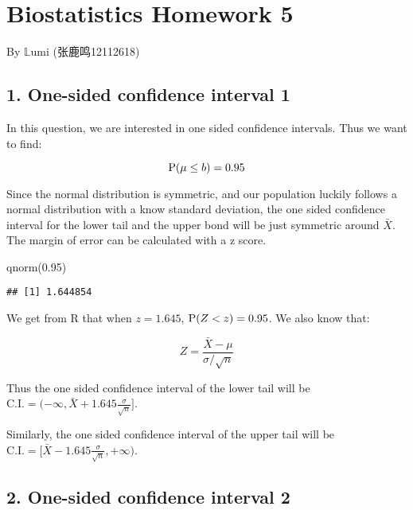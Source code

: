 \documentclass[
]{article}
\author{}
\date{\vspace{-2.5em}}
\newenvironment{Shaded}{\begin{snugshade}}{\end{snugshade}}
\newcommand{\FloatTok}[1]{\textcolor[rgb]{0.00,0.00,0.81}{#1}}
\newcommand{\FunctionTok}[1]{\textcolor[rgb]{0.00,0.00,0.00}{#1}}
\newcommand{\NormalTok}[1]{#1}
\begin{document}
\hypertarget{biostatistics-homework-5}{%
\section{Biostatistics Homework 5}\label{biostatistics-homework-5}}

By \(\mathbb{L}\)umi (张鹿鸣12112618)

\vspace{5mm}

\hypertarget{one-sided-confidence-interval-1}{%
\subsection{1. One-sided confidence interval
1}\label{one-sided-confidence-interval-1}}

In this question, we are interested in one sided confidence intervals.
Thus we want to find:

\[
\text P (\mu \leq b) = 0.95
\]

Since the normal distribution is symmetric, and our population luckily
follows a normal distribution with a know standard deviation, the one
sided confidence interval for the lower tail and the upper bond will be
just symmetric around \(\bar X\). The margin of error can be calculated
with a z score.

\begin{Shaded}
\begin{Highlighting}[]
\FunctionTok{qnorm}\NormalTok{(}\FloatTok{0.95}\NormalTok{)}
\end{Highlighting}
\end{Shaded}

\begin{verbatim}
## [1] 1.644854
\end{verbatim}

We get from R that when \(z = 1.645\), \(\text P (Z < z) = 0.95\). We
also know that:

\[
Z = \frac{\bar X - \mu}{\sigma / \sqrt{n}}
\]

Thus the one sided confidence interval of the lower tail will be
\(\text{C.I.} = (- \infty, \bar X + 1.645 \frac{\sigma}{\sqrt{n}}]\).

Similarly, the one sided confidence interval of the upper tail will be
\(\text{C.I.} = [\bar X - 1.645 \frac{\sigma}{\sqrt{n}}, + \infty)\).

\hypertarget{one-sided-confidence-interval-2}{%
\subsection{2. One-sided confidence interval
2}\label{one-sided-confidence-interval-2}}
\end{document}
